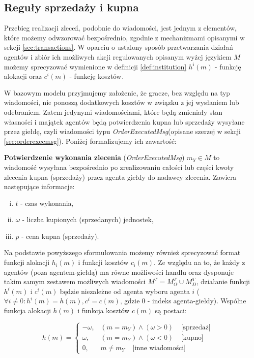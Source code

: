 
\subsection{Reguły sprzedaży i kupna}\label{sec:marketrules}

Przebieg realizacji zleceń, podobnie do wiadomości, jest jednym z elementów, które możemy odwzorować bezpośrednio, zgodnie z mechanizmami opisanymi w sekcji \ref{sec:transactions}. W oparciu o ustalony sposób przetwarzania działań agentów i zbiór ich możliwych akcji regulowanych opisanym wyżej językiem $M$ możemy sprecyzować wymienione w definicji \ref{def:institution} $h^i(m)$ - funkcję alokacji oraz  $c^i(m)$ - funkcję kosztów. 

W bazowym modelu przyjmujemy założenie, że gracze, bez względu na typ wiadomości, nie ponoszą dodatkowych kosztów w związku z jej wysłaniem lub odebraniem. Zatem jedynymi wiadomościami, które będą zmieniały stan własności i majątek agentów będą potwierdzenia kupna lub sprzedaży wysyłane przez giełdę, czyli wiadomości typu \textit{OrderExecutedMsg}(opisane szerzej w sekcji \ref{sec:orderexecmsg}). Poniżej formalizujemy ich zawartość: 
\begin{definition}\label{def:ordexec}
\textbf{Potwierdzenie wykonania zlecenia} (\textit{OrderExecutedMsg}) $m_Y \in M$ to wiadomość wysyłana bezpośrednio po zrealizowaniu całości lub części kwoty zlecenia kupna (sprzedaży) przez agenta giełdy do nadawcy zlecenia. Zawiera następujące informacje: 
\begin{enumerate}[i.]
\item $t$ - czas wykonania, 
\item $\omega$ - liczba kupionych (sprzedanych) jednostek, 
\item $p$ - cena kupna (sprzedaży).
\end{enumerate}
\end{definition}
Na podstawie powyższego sformułowania możemy również sprecyzować format funkcji alokacji $h_i(m)$ i funkcji kosztów $c_i(m)$. Ze względu na to, że każdy z agentów (poza agentem-giełdą) ma równe możliwości handlu oraz dysponuje takim samym zestawem możliwych wiadomości $M^T = M^T_O \cup M^T_D$, działanie funkcji $h^i(m)$ i $c^i(m)$ będzie niezależne od agenta wyboru agenta $i$ ($\forall i \neq 0 : h^i(m) = h(m), c^i=c(m)$, gdzie $0$ - indeks agenta-giełdy). Wspólne funkcja alokacji $h(m)$ i funkcja kosztów $c(m)$ są postaci: 

$$ h(m) = 
 \left\{\begin{array}{lr}
        -\omega, & (m = m_Y) \wedge (\omega>0)\;\;\;\;\text{[sprzedaż]}\\
        \omega, & (m=m_Y) \wedge (\omega <0)\;\;\;\; \text{[kupno]}\\
        0, & m\neq m_Y \;\;\;\; \text{[inne wiadomości]}
        \end{array}
$$

